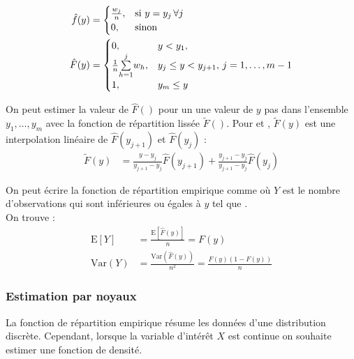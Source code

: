 \documentclass[10pt, french]{article}
\begin{document}
\begin{multicols*}{2}
\begin{align*}
	\hat{f}(y)
	&=	\begin{cases}
		\frac{w_{j}}{n},	&	\text{si } y = y_{j} \, \forall j	\\
		0,	&	\text{sinon}
		\end{cases}	\\
		\hat{F}(y)
	&=	\begin{cases}
		0,	&	y	<	y_{1},	\\
		\frac{1}{n}\overset{j}{\underset{h = 1}{\sum}}w_{h},	&	y_{j}	\leq	y	<	y_{j + 1}, \, j	=	1, \dots, m - 1	\\
		1,	&	y_{m}	\leq	y
		\end{cases}
\end{align*}		

On peut estimer la valeur de $\hat{F}()$ pour un une valeur de $y$ pas dans l'ensemble $y_{1}, \dots, y_{m}$ avec la fonction de répartition lissée $\tilde{F}()$. Pour  et , $\tilde{F}(y)$ est une interpolation linéaire de $\hat{F}(y_{j + 1})$ et $\hat{F}(y_{j})$ :
\begin{align*}
	\tilde{F}(y)
	&=	\frac{y	-	y_{j	}}{y_{j + 1}	-	y_{j}}\hat{F}(y_{j + 1})  + 
		\frac{y_{j + 1}	-	y_{j	}}{y_{j + 1}	-	y_{j}}\hat{F}(y_{j})
\end{align*}

\begin{definitionNOHFILLprop}
On peut écrire la fonction de répartition empirique comme  où $Y$ est le nombre d'observations qui sont inférieures ou égales à $y$ tel que .\\

On trouve :
\begin{align*}
	\text{E}[Y]	
	&=	\frac{\text{E}[\hat{F}(y)]}{n}
	=	F(y)		\\
	\text{Var}(Y)
	&=	\frac{\text{Var}(\hat{F}(y))}{n^{2}}
	=	\frac{F(y)(1 - F(y))}{n}
\end{align*}
\end{definitionNOHFILLprop}


\subsubsection{Estimation par noyaux}
La fonction de répartition empirique résume les données d'une distribution discrète. Cependant, lorsque la variable d'intérêt $X$ est continue on souhaite estimer une fonction de densité.


\end{multicols*}
\end{document}
